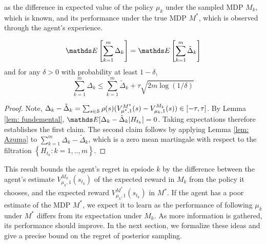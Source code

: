 as the difference in expected value of the policy $\mu_k$ under the sampled MDP $M_k$, which is known, and its performance under the true MDP $M^*$, which is observed through the agent's experience.

\begin{theorem}
\begin{equation}
\Exp \left[ \sum_{k=1}^{m} \Delta_k \right] =\Exp \left[ \sum_{k=1}^{m} \tilde{\Delta}_k \right] 
\end{equation}
and for any $\delta>0$ with probability at least $1-\delta$, 
\begin{equation} \label{eq: from Delta to Delta tilde}
\sum_{k=1}^{m} \Delta_k \leq \sum_{k=1}^{m} \tilde{\Delta}_k +\tau \sqrt{2m \log(1/\delta)} 
\end{equation}
\end{theorem}
\begin{proof}
Note,  $\Delta_k - \tilde{\Delta}_k =\sum_{s \in \mathcal{S}} \rho(s) (V^{M^*}_{\mu^*, 1}(s) - V^{M_k}_{\mu_k, 1}(s)) \in [-\tau, \tau]$. By Lemma \ref{lem: fundemental}, $\Exp[\Delta_k - \tilde{\Delta}_k \vert H_{t_k}] =0 $. Taking expectations therefore establishes the first claim. The second claim follows by applying Lemma \ref{lem: Azuma} to $\sum_{k=1}^{m} \Delta_k - \tilde{\Delta}_k$, which is a zero mean martingale with respect to the filtration $\left\{ H_{t_k}: k=1,..,m \right\}$. 
\end{proof}

This result bounds the agent's regret in epsiode $k$ by the difference between the agent's estimate $V^{M_k}_{\mu_k, 1}(s_{t_k})$ of the expected reward in $M_k$ from the policy it chooses, and the expected reward $V^{M^*}_{\mu_k, 1}(s_{t_k})$ in $M^*$. If the agent has a poor estimate of the MDP $M^*$, we expect it to learn as the performance of following $\mu_k$ under $M^*$ differs from its expectation under $M_k$. As more information is gathered, its performance should improve. In the next section, we formalize these ideas and give a precise bound on the regret of posterior sampling. 
